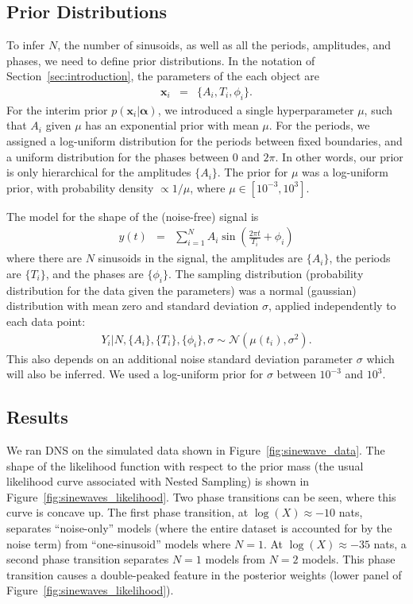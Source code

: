 \documentclass[letterpaper, 11pt]{article}
\newcommand{\hyperparams}{\boldsymbol{\alpha}}
\newcommand{\xx}{\mathbf{x}}
\begin{document}
\subsection{Prior Distributions}
To infer $N$, the number of sinusoids, as well as all the periods, amplitudes,
and phases, we need to define prior distributions.
In the notation of Section~\ref{sec:introduction}, the parameters of the
each object are
\begin{eqnarray}
\xx_i &=& \{A_i, T_i, \phi_i\}.
\end{eqnarray}
For the interim prior $p(\xx_i | \hyperparams)$, we introduced a single
hyperparameter $\mu$, such that $A_i$ given $\mu$ has an exponential prior
with mean $\mu$. For the periods, we assigned a log-uniform distribution for
the periods between fixed boundaries, and a uniform distribution for the phases
between 0 and $2\pi$. In other words, our prior is only hierarchical for the
amplitudes $\{A_i\}$. The prior for $\mu$ was a log-uniform prior, with
probability density $\propto 1/\mu$, where $\mu \in [10^{-3}, 10^3]$.

The model for the shape of the (noise-free) signal is
\begin{eqnarray}
y(t) &=& \sum_{i=1}^N A_i \sin \left(\frac{2\pi t}{T_i} + \phi_i\right)
\end{eqnarray}
where there are $N$ sinusoids in the signal, the
amplitudes are $\{A_i\}$, the periods are $\{T_i\}$, and the phases are
$\{\phi_i\}$.
The sampling distribution (probability distribution for the data given the
parameters) was a normal (gaussian) distribution with mean zero and standard
deviation $\sigma$, applied independently to each data point:
\begin{eqnarray}
Y_i | N, \{A_i\}, \{T_i\}, \{\phi_i\}, \sigma \sim
\mathcal{N}\left(\mu(t_i), \sigma^2\right).
\end{eqnarray}
This also depends on an additional noise standard deviation parameter $\sigma$
which will also be inferred. We used a log-uniform prior for $\sigma$ between
$10^{-3}$ and $10^{3}$.

\subsection{Results}
We ran DNS on the simulated data shown in Figure~\ref{fig:sinewave_data}.
The shape of the likelihood function with respect to the prior mass (the
usual likelihood curve associated with Nested Sampling) is shown in
Figure~\ref{fig:sinewaves_likelihood}. Two phase transitions can be seen,
where this curve is concave up. The
first phase transition, at $\log(X) \approx -10$ nats,
separates ``noise-only'' models (where the
entire dataset is accounted for by the noise term) from ``one-sinusoid'' models
where $N=1$. At $\log(X) \approx -35$ nats, a second phase transition separates
$N=1$ models from $N=2$ models. This phase transition causes a double-peaked
feature in the posterior weights (lower panel of
Figure~\ref{fig:sinewaves_likelihood}).
\end{document}

